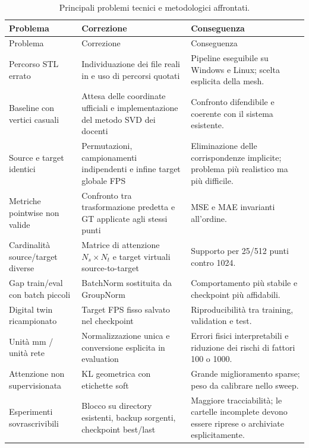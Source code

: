 \documentclass[11pt,a4paper]{article}
\newcommand{\code}[1]{\texttt{\detokenize{#1}}}
\begin{document}
\begin{longtable}{p{}p{}p{}}
\caption{Principali problemi tecnici e metodologici affrontati.}\\
\toprule
Problema & Correzione & Conseguenza \\
\midrule
\endfirsthead
\toprule
Problema & Correzione & Conseguenza \\
\midrule
\endhead
Percorso STL errato & Individuazione dei file reali in
\code{ModelloPhantom} e uso di percorsi quotati & Pipeline eseguibile su
Windows e Linux; scelta esplicita della mesh. \\

Baseline con vertici casuali & Attesa delle coordinate ufficiali e
implementazione del metodo SVD dei docenti & Confronto difendibile e coerente
con il sistema esistente. \\

Source e target identici & Permutazioni, campionamenti indipendenti e infine
target globale FPS & Eliminazione delle corrispondenze implicite; problema più
realistico ma più difficile. \\

Metriche pointwise non valide & Confronto tra trasformazione predetta e GT
applicate agli stessi punti & MSE e MAE invarianti all'ordine. \\

Cardinalità source/target diverse & Matrice di attenzione $N_s\times N_t$ e
target virtuali source-to-target & Supporto per 25/512 punti contro 1024. \\

Gap train/eval con batch piccoli & BatchNorm sostituita da GroupNorm &
Comportamento più stabile e checkpoint più affidabili. \\

Digital twin ricampionato & Target FPS fisso salvato nel checkpoint &
Riproducibilità tra training, validation e test. \\

Unità mm / unità rete & Normalizzazione unica e conversione esplicita in
evaluation & Errori fisici interpretabili e riduzione dei rischi di fattori
100 o 1000. \\

Attenzione non supervisionata & KL geometrica con etichette soft & Grande
miglioramento sparse; peso da calibrare nello sweep. \\

Esperimenti sovrascrivibili & Blocco su directory esistenti, backup sorgenti,
checkpoint best/last & Maggiore tracciabilità; le cartelle incomplete devono
essere riprese o archiviate esplicitamente. \\
\bottomrule
\end{longtable}
\end{document}

